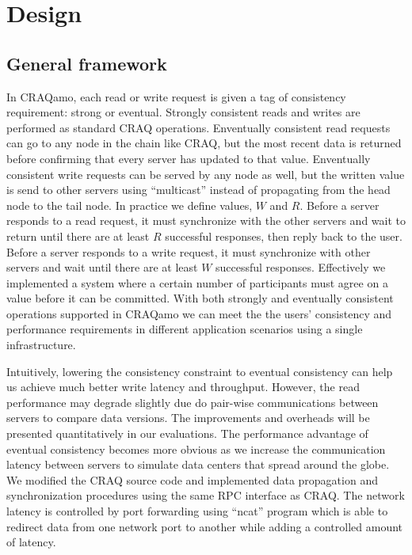 \section{Design}
\label{sec:design}

\subsection{General framework}
In CRAQamo, each read or write request is given a tag of consistency requirement: strong or eventual. Strongly consistent reads and writes are performed as standard CRAQ operations. Enventually consistent read requests can go to any node in the chain like CRAQ, but the most recent data is returned before confirming that every server has updated to that value. Enventually consistent write requests can be served by any node as well, but the written value is send to other servers using ``multicast'' instead of propagating from the head node to the tail node. In practice we define values, $W$ and $R$. Before a server responds to a read request, it must synchronize with the other servers and wait to return until there are at least $R$ successful responses, then reply back to the user.  Before a server responds to a write request, it must synchronize with other servers and wait until there are at least $W$ successful responses. Effectively we implemented a system where a certain number of participants must agree on a value before it can be committed. With both strongly and eventually consistent operations supported in CRAQamo we can meet the the users' consistency and performance requirements in different application scenarios using a single infrastructure. 

Intuitively, lowering the consistency constraint to eventual consistency can help us achieve much better write latency and throughput. However, the read performance may degrade slightly due do pair-wise communications between servers to compare data versions. The improvements and overheads will be presented quantitatively in our evaluations. The performance advantage of eventual consistency becomes more obvious as we increase the communication latency between servers to simulate data centers that spread around the globe. We modified the CRAQ source code and implemented data propagation and synchronization procedures using the same RPC interface as CRAQ. The network latency is controlled by port forwarding using ``ncat'' program which is able to redirect data from one network port to another while adding a controlled amount of latency.

